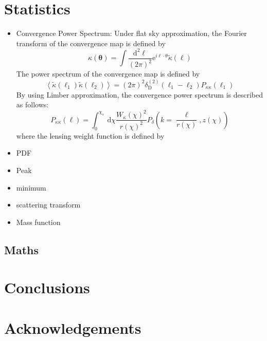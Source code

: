 \documentclass[fleqn,usenatbib]{mnras}
\begin{document}
\section{Statistics}
\begin{itemize}
    \item Convergence Power Spectrum: 
    Under flat sky approximation, the Fourier transform of the convergence map is defined by 
    \begin{equation}
        \kappa(\boldsymbol{\theta})=\int \frac{\mathrm{d}^2 \ell}{(2 \pi)^2} \mathrm{e}^{i \ell \cdot \theta} \tilde{\kappa}(\boldsymbol{\ell})
    \end{equation}
    The power spectrum of the convergence map is defined by
    \begin{equation}
        \left\langle\tilde{\kappa}\left(\boldsymbol{\ell}_1\right) \tilde{\kappa}\left(\boldsymbol{\ell}_2\right)\right\rangle=(2 \pi)^2 \delta_{\mathrm{D}}^{(2)}\left(\boldsymbol{\ell}_1-\boldsymbol{\ell}_2\right) P_{\kappa \kappa}\left(\ell_1\right)
    \end{equation}
    By using Limber approximation, the convergence power spectrum is described as follows:
    \begin{equation}
        P_{\kappa \kappa}(\ell)=\int_0^{\chi_s} \mathrm{~d} \chi \frac{W_\kappa(\chi)^2}{r(\chi)^2} P_\delta\left(k=\frac{\ell}{r(\chi)}, z(\chi)\right)
    \end{equation}
    where the lensing weight function is defined by
    
    \item PDF
    \item Peak
    \item minimum
    \item scattering transform
    \item Mass function
\end{itemize}

\subsection{Maths}

\section{Conclusions}



\section*{Acknowledgements}
\end{document}
